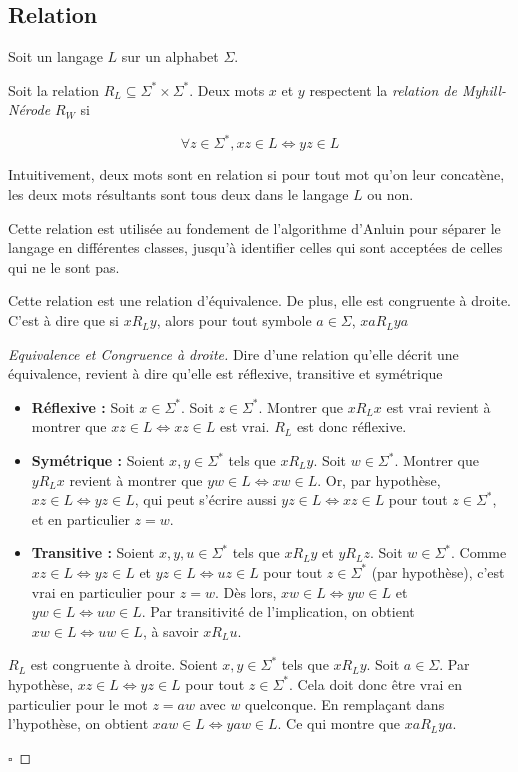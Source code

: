 \subsection{Relation \rl}\label{angluin:rl}

Soit un langage $L$ sur un alphabet $\Sigma$.

Soit la relation $R_L\subseteq\Sigma^*\times\Sigma^*$. Deux mots $x$ et $y$ respectent la \emph{relation de Myhill-Nérode $R_W$} si

$$\forall z \in \Sigma^*, xz \in L \Leftrightarrow yz \in L$$

Intuitivement, deux mots sont en relation si pour tout mot qu'on leur concatène, les deux mots résultants sont tous deux dans le langage $L$ ou non.

Cette relation est utilisée au fondement de l'algorithme d'Anluin pour séparer le langage en différentes classes, jusqu'à identifier celles qui sont acceptées de celles qui ne le sont pas.

\begin{lemma}
	Cette relation est une relation d'équivalence. De plus, elle est congruente à droite. C'est à dire que si $xR_Ly$, alors pour tout symbole $a \in \Sigma$, $xaR_Lya$
\end{lemma}

\begin{proof}[Equivalence et Congruence à droite]
	Dire d'une relation qu'elle décrit une équivalence, revient à dire qu'elle est réflexive, transitive et symétrique
\begin{itemize}
		\item\textbf{Réflexive :} Soit $x \in \Sigma^*$. Soit $z \in \Sigma^*$. Montrer que $xR_Lx$ est vrai revient à montrer que $ xz \in L \Leftrightarrow xz \in L$ est vrai. $R_L$ est donc réflexive.
		\item \textbf{Symétrique :} Soient $x, y \in \Sigma^*$ tels que $xR_Ly$. Soit $w \in \Sigma^*$. Montrer que $yR_Lx$ revient à montrer que $ yw \in L \Leftrightarrow xw \in L$. Or, par hypothèse, $ xz \in L \Leftrightarrow yz \in L$, qui peut s'écrire aussi $ yz \in L \Leftrightarrow xz \in L$ pour tout $z \in \Sigma^*$, et en particulier $z=w$.
		\item \textbf{Transitive :} Soient $x,y,u \in \Sigma^*$ tels que $xR_Ly$ et $yR_Lz$. Soit $w \in \Sigma^*$. Comme $ xz \in L \Leftrightarrow yz \in L$ et $ yz \in L \Leftrightarrow uz \in L$ pour tout $z \in \Sigma^*$ (par hypothèse), c'est vrai en particulier pour $z=w$. Dès lors,  $ xw \in L \Leftrightarrow yw \in L$ et $ yw \in L \Leftrightarrow uw \in L$. Par transitivité de l'implication, on obtient $ xw \in L \Leftrightarrow uw \in L$, à savoir $xR_Lu$.
	\end{itemize}

	$R_L$ est congruente à droite. Soient $x,y \in \Sigma^*$ tels que $xR_Ly$. Soit $a \in \Sigma$. Par hypothèse, $ xz \in L \Leftrightarrow yz \in L$ pour tout $z \in \Sigma^*$. Cela doit donc être vrai en particulier pour le mot $z=aw$ avec $w$ quelconque. En remplaçant dans l'hypothèse, on obtient  $ xaw \in L \Leftrightarrow yaw \in L$. Ce qui montre que $xaR_Lya$.

\hfill$\square$
\end{proof}



